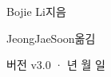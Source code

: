 \begin{titlepage}
\vfill
{\LARGE\sffamily Bojie Li\quad 지음\par}
\vspace{0.35cm}
{\large\sffamily\color{structurecolor} JeongJaeSoon\quad 옮김\par}
\vspace{0.7cm}
{\small\sffamily\color{structurecolor!80} 버전 v3.0 · \number\year 년 \number\month 월 \number\day 일\par}
\vspace{1.2cm}
\end{titlepage}

